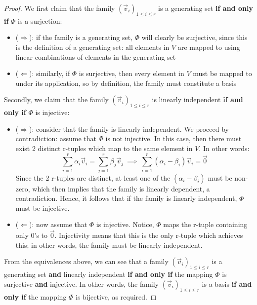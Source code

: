 \documentclass{exam}
\begin{document}
\begin{proof}

We first claim that the family $(\vec{v}_i)_{1 \leq i \leq r}$ is a generating set \textbf{if and only if} $\Phi$ is a surjection:
\begin{itemize}
    \item ($\Longrightarrow$): if the family is a generating set, $\Phi$ will clearly be surjective, since this is the definition of a generating set: all elements in $V$ are mapped to using linear combinations of elements in the generating set
    \item ($\Longleftarrow$): similarly, if $\Phi$ is surjective, then every element in $V$ must be mapped to under its application, so by definition, the family must constitute a basis
\end{itemize}

Secondly, we claim that the family $(\vec{v}_i)_{1 \leq i \leq r}$ is linearly independent \textbf{if and only if} $\Phi$ is injective:
\begin{itemize}
    \item ($\Longrightarrow$): consider that the family is linearly independent. We proceed by contradiction: assume that $\Phi$ is not injective. In this case, then there must exist 2 distinct r-tuples which map to the same element in $V$. In other words:
    \[
    \sum_{i = 1}^r\alpha_i\vec{v}_i = \sum_{j = 1}^r\beta_j\vec{v}_j \ \implies \ \sum_{i = 1}^r(\alpha_i - \beta_i) \vec{v}_i = \vec{0}
    \]
    Since the 2 r-tuples are distinct, at least one of the $(\alpha_i - \beta_i)$ must be non-zero, which then implies that the family is linearly dependent, a contradiction. Hence, it follows that if the family is linearly independent, $\Phi$ must be injective.
    \item ($\Longleftarrow$): now assume that $\Phi$ is injective. Notice, $\Phi$ maps the r-tuple containing only 0's to $\vec{0}$. Injectivity means that this is the only r-tuple which achieves this; in other words, the family must be linearly independent.
\end{itemize}

From the equivalences above, we can see that a family $(\vec{v}_i)_{1 \leq i \leq r}$ is a generating set \textbf{and} linearly independent \textbf{if and only if} the mapping $\Phi$ is surjective \textbf{and} injective. In other words, the family $(\vec{v}_i)_{1 \leq i \leq r}$ is a basis \textbf{if and only if} the mapping $\Phi$ is bijective, as required.

\end{proof}
\end{document}
